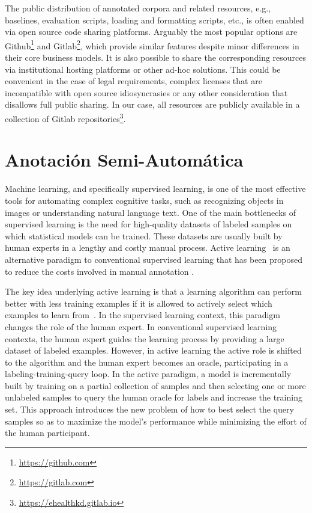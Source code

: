  The public distribution of annotated corpora and related resources, e.g., baselines, evaluation scripts,
  loading and formatting scripts, etc., is often enabled via open source code sharing platforms.
  Arguably the most popular options are Github\footnote{\url{https://github.com}} and
  Gitlab\footnote{\url{https://gitlab.com}}, which provide similar features despite minor
  differences in their core business models.
  It is also possible to share the corresponding resources via institutional hosting platforms or
  other ad-hoc solutions. This could be convenient in the case of legal requirements, complex licenses that are incompatible with open source idiosyncrasies or any other consideration
  that disallows full public sharing.
  In our case, all resources are publicly available in a collection of Gitlab repositories\footnote{\url{https://ehealthkd.gitlab.io}}.

  \section{Anotación Semi-Automática}

Machine learning, and specifically supervised learning, is one of the most effective tools for automating complex cognitive tasks, such as recognizing objects in images or understanding natural language text.
One of the main bottlenecks of supervised learning is the need for high-quality datasets of labeled samples on which statistical models can be trained.
These datasets are usually built by human experts in a lengthy and costly manual process.
Active learning~\cite{Cohn2010ActiveL} is an alternative paradigm to conventional supervised learning that has been proposed to reduce the costs involved in manual annotation .

The key idea underlying active learning is that a learning algorithm can perform better with less training examples if it is allowed to actively select which examples to learn from~\cite{survey}.
In the supervised learning context, this paradigm changes the role of the human expert.
In conventional supervised learning contexts, the human expert guides the learning process by providing a large dataset of labeled examples. However, in active learning the active role is shifted to the algorithm and the human expert becomes an oracle, participating in a labeling-training-query loop.
In the active paradigm,  a model is incrementally built by training on a partial collection of samples and then selecting one or more unlabeled samples to query the human oracle for labels and increase the training set.
This approach introduces the new problem of how to best select the query samples so as to maximize the model's performance while minimizing the effort of the human participant.

